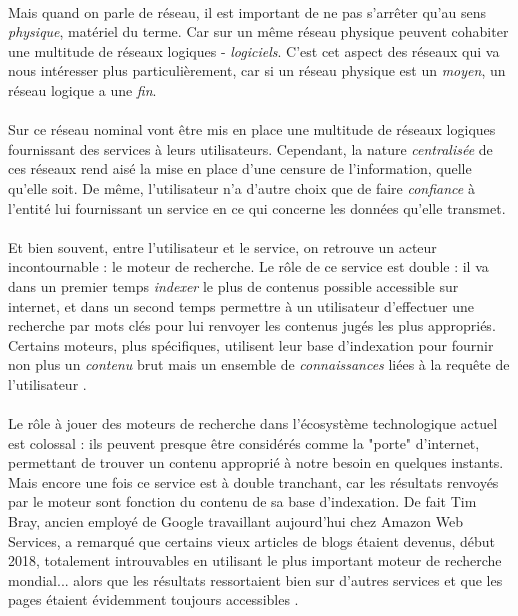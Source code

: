\paragraph{} Mais quand on parle de réseau, il est important de ne pas s'arrêter qu'au sens \emph{physique}, matériel du
terme. Car sur un même réseau physique peuvent cohabiter une multitude de réseaux logiques - \emph{logiciels}. C'est cet
aspect des réseaux qui va nous intéresser plus particulièrement, car si un réseau physique est un \emph{moyen}, un réseau
logique a une \emph{fin}.

\paragraph{} Sur ce réseau nominal vont être mis en place une multitude de réseaux logiques fournissant des services à
leurs utilisateurs. Cependant, la nature \emph{centralisée} de ces réseaux rend aisé la mise en place d'une censure de
l'information, quelle qu'elle soit. De même, l'utilisateur n'a d'autre choix que de faire \emph{confiance} à l'entité
lui fournissant un service en ce qui concerne les données qu'elle transmet.

\paragraph{} Et bien souvent, entre l'utilisateur et le service, on retrouve un acteur incontournable : le moteur de
recherche. Le rôle de ce service est double : il va dans un premier temps \emph{indexer} le plus de contenus possible
accessible sur internet, et dans un second temps permettre à un utilisateur d'effectuer une recherche par mots clés 
pour lui renvoyer les contenus jugés les plus appropriés. Certains moteurs, plus spécifiques, utilisent leur base
d'indexation pour fournir non plus un \emph{contenu} brut mais un ensemble de \emph{connaissances} liées à la requête
de l'utilisateur \cite{Internet2}.

\paragraph{} Le rôle à jouer des moteurs de recherche dans l'écosystème technologique actuel est colossal : ils peuvent
presque être considérés comme la "porte" d'internet, permettant de trouver un contenu approprié à notre besoin en quelques
instants. Mais encore une fois ce service est à double tranchant, car les résultats renvoyés par le moteur sont fonction
du contenu de sa base d'indexation. De fait Tim Bray, ancien employé de Google travaillant aujourd'hui chez Amazon Web Services,
a remarqué que certains vieux articles de blogs étaient devenus, début 2018, totalement introuvables en utilisant le plus
important moteur de recherche mondial... alors que les résultats ressortaient bien sur d'autres services et que les pages 
étaient évidemment toujours accessibles \cite{Internet3}.

